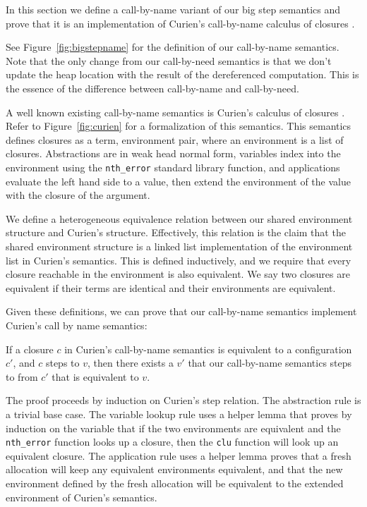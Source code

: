 In this section we define a call-by-name variant of our big step semantics and
prove that it is an implementation of Curien's call-by-name calculus of
closures \cite{curien}. 

See Figure~\ref{fig:bigstepname} for the definition of our call-by-name
semantics. Note that the only change from our call-by-need semantics is that we
don't update the heap location with the result of the dereferenced computation.
This is the essence of the difference between call-by-name and call-by-need.

A well known existing call-by-name semantics is Curien's calculus of closures
\cite{curien}. Refer to Figure~\ref{fig:curien} for a formalization of this
semantics. This semantics defines closures as a term, environment pair, where an
environment is a list of closures. Abstractions are in weak head normal form,
variables index into the environment using the \texttt{nth\_error} standard
library function, and applications evaluate the left hand side to a value, then
extend the environment of the value with the closure of the argument. 

We define a heterogeneous equivalence relation between our shared environment
structure and Curien's structure. Effectively, this relation is the claim that
the shared environment structure is a linked list implementation of the
environment list in Curien's semantics. This is defined inductively, and we
require that every closure reachable in the environment is also equivalent.  We
say two closures are equivalent if their terms are identical and their
environments are equivalent. 

Given these definitions, we can prove that our call-by-name semantics implement
Curien's call by name semantics: 

\begin{theorem}
If a closure $c$ in Curien's call-by-name semantics is equivalent to a
configuration $c'$, and $c$ steps to $v$, then there exists a $v'$ that our
call-by-name semantics steps to from $c'$ that is equivalent to $v$.
\end{theorem}
\begin{proofoutline}
The proof proceeds by induction on Curien's step relation. The abstraction rule
is a trivial base case. The variable lookup rule uses a helper lemma that proves
by induction on the variable that if the two environments are equivalent and the
\texttt{nth\_error} function looks up a closure, then the \texttt{clu} function
will look up an equivalent closure. The application rule uses a helper lemma
proves that a fresh allocation will keep any equivalent environments equivalent,
and that the new environment defined by the fresh allocation will be equivalent
to the extended environment of Curien's semantics.
\end{proofoutline}

